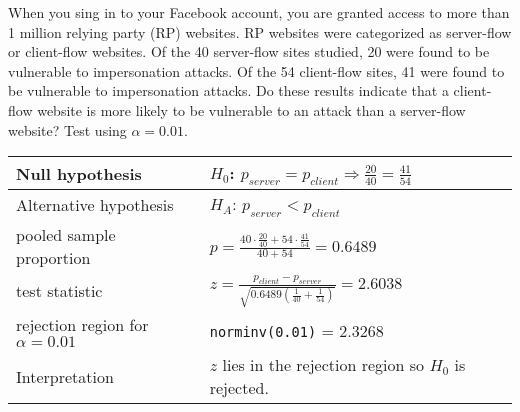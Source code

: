 \begin{example}
	When you sing in to your Facebook account, you are granted access to more than 1 million relying party (RP) websites. RP websites were categorized as server-flow or client-flow websites. Of the 40 server-flow sites studied, 20 were found to be vulnerable to impersonation attacks. Of the 54 client-flow sites, 41 were found to be vulnerable to impersonation attacks. Do these results indicate that a client-flow website is more likely to be vulnerable to an attack than a server-flow website? Test using $\alpha = 0.01$.
	\begin{center}
		\begin{tabular}{p{4cm}|p{7cm}}
			Null hypothesis & $H_0$: $p_{server}=p_{client}\Rightarrow \frac{20}{40}=\frac{41}{54}$ \\
			\hline
			Alternative hypothesis & $H_A$: $p_{server} < p_{client}$ \\
			\hline
			pooled sample proportion & $p = \frac{40\cdot\frac{20}{40} + 54\cdot\frac{41}{54}}{40+54} = 0.6489$ \\
			\hline
			test statistic & $z=\frac{p_{client}-p_{server}}{\sqrt{0.6489(\frac{1}{40} + \frac{1}{54})}} = 2.6038$ \\
			\hline
			rejection region for $\alpha=0.01$ & \texttt{norminv(0.01)} = 2.3268 \\
			\hline
			Interpretation & $z$ lies in the rejection region so $H_0$ is rejected.
		\end{tabular}
	\end{center}
	\begin{center}
	\end{center}
\end{example}

